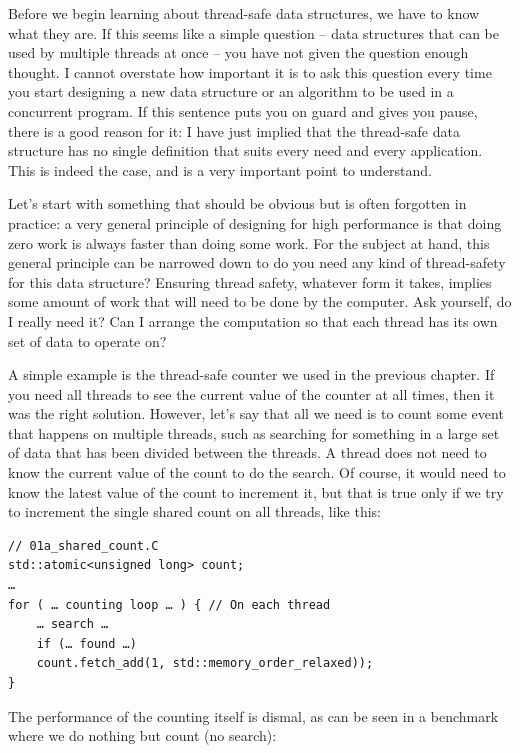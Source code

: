 
Before we begin learning about thread-safe data structures, we have to know what they are. If this seems like a simple question – data structures that can be used by multiple threads at once – you have not given the question enough thought. I cannot overstate how important it is to ask this question every time you start designing a new data structure or an algorithm to be used in a concurrent program. If this sentence puts you on guard and gives you pause, there is a good reason for it: I have just implied that the thread-safe data structure has no single definition that suits every need and every application. This is indeed the case, and is a very important point to understand.


Let's start with something that should be obvious but is often forgotten in practice: a very general principle of designing for high performance is that doing zero work is always faster than doing some work. For the subject at hand, this general principle can be narrowed down to do you need any kind of thread-safety for this data structure? Ensuring thread safety, whatever form it takes, implies some amount of work that will need to be done by the computer. Ask yourself, do I really need it? Can I arrange the computation so that each thread has its own set of data to operate on?

A simple example is the thread-safe counter we used in the previous chapter. If you need all threads to see the current value of the counter at all times, then it was the right solution. However, let's say that all we need is to count some event that happens on multiple threads, such as searching for something in a large set of data that has been divided between the threads. A thread does not need to know the current value of the count to do the search. Of course, it would need to know the latest value of the count to increment it, but that is true only if we try to increment the single shared count on all threads, like this:

\begin{lstlisting}[style=styleCXX]
// 01a_shared_count.C
std::atomic<unsigned long> count;
…
for ( … counting loop … ) { // On each thread
	… search …
	if (… found …)
	count.fetch_add(1, std::memory_order_relaxed));
}
\end{lstlisting}

The performance of the counting itself is dismal, as can be seen in a benchmark where we do nothing but count (no search):

